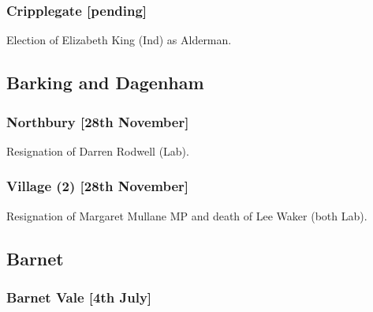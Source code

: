 \documentclass[a4paper,openany]{book}
\begin{document}
\begin{resultsiii}
\subsubsection*{Cripplegate \hspace*{\fill}\nolinebreak[1]%
	\enspace\hspace*{\fill}
	[pending]}


Election of Elizabeth King (Ind) as Alderman.

\subsection*{Barking and Dagenham}

\subsubsection*{Northbury \hspace*{\fill}\nolinebreak[1]%
	\enspace\hspace*{\fill}
	[28th November]}


Resignation of Darren Rodwell (Lab).

\subsubsection*{Village (2) \hspace*{\fill}\nolinebreak[1]%
	\enspace\hspace*{\fill}
	[28th November]}


Resignation of Margaret Mullane MP and death of Lee Waker (both Lab).

\subsection*{Barnet}

\subsubsection*{Barnet Vale \hspace*{\fill}\nolinebreak[1]%
	\enspace\hspace*{\fill}
	[4th July]}


\end{resultsiii}
\end{document}
